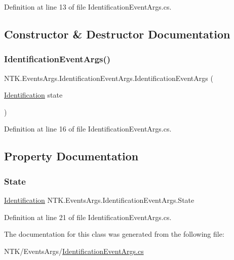 Definition at line 13 of file Identification\+Event\+Args.\+cs.



\subsection{Constructor \& Destructor Documentation}
\mbox{\label{class_n_t_k_1_1_events_args_1_1_identification_event_args_a3eca5646646247b150d3776acea6b8d1}} 
\subsubsection{\texorpdfstring{IdentificationEventArgs()}{IdentificationEventArgs()}}
{\footnotesize\ttfamily N\+T\+K.\+Events\+Args.\+Identification\+Event\+Args.\+Identification\+Event\+Args (\begin{DoxyParamCaption}\item[{\mbox{\hyperlink{namespace_n_t_k_aa439a107aef6a5399750b755a88ccf07}{Identification}}}]{state }\end{DoxyParamCaption})}



Definition at line 16 of file Identification\+Event\+Args.\+cs.



\subsection{Property Documentation}
\mbox{\label{class_n_t_k_1_1_events_args_1_1_identification_event_args_a8f27e067071f88a0610606fc3428014e}} 
\subsubsection{\texorpdfstring{State}{State}}
{\footnotesize\ttfamily \mbox{\hyperlink{namespace_n_t_k_aa439a107aef6a5399750b755a88ccf07}{Identification}} N\+T\+K.\+Events\+Args.\+Identification\+Event\+Args.\+State\hspace{0.3cm}{\ttfamily [get]}}



Definition at line 21 of file Identification\+Event\+Args.\+cs.



The documentation for this class was generated from the following file\+:\begin{DoxyCompactItemize}
\item 
N\+T\+K/\+Events\+Args/\mbox{\hyperlink{_identification_event_args_8cs}{Identification\+Event\+Args.\+cs}}\end{DoxyCompactItemize}
